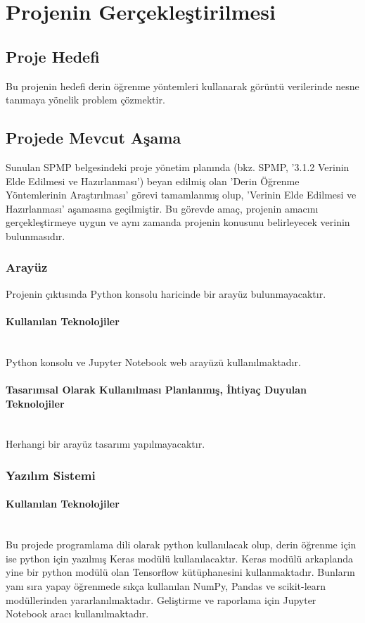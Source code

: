 \documentclass[12pt,a4paper]{article}
\newcommand{\subsubsubsection}[1]{\paragraph{#1}\mbox{}\\}
\begin{document}
    
    \newpage

    \tableofcontents
    \newpage


    \section{Projenin Gerçekleştirilmesi}
    \subsection{Proje Hedefi}
    Bu projenin hedefi derin öğrenme yöntemleri kullanarak görüntü verilerinde nesne tanımaya yönelik problem çözmektir.

    \subsection{Projede Mevcut Aşama}
    Sunulan SPMP belgesindeki proje yönetim planında (bkz. SPMP, '3.1.2 Verinin Elde Edilmesi ve Hazırlanması') beyan edilmiş olan 
    'Derin Öğrenme Yöntemlerinin Araştırılması' görevi tamamlanmış
    olup, 'Verinin Elde Edilmesi ve Hazırlanması' aşamasına geçilmiştir. Bu görevde amaç, projenin amacını gerçekleştirmeye uygun ve aynı zamanda projenin
    konusunu belirleyecek verinin bulunmasıdır.

    \subsubsection{Arayüz}
    Projenin çıktısında Python konsolu haricinde bir arayüz bulunmayacaktır.

    \subsubsubsection{Kullanılan Teknolojiler}
    Python konsolu ve Jupyter Notebook web arayüzü kullanılmaktadır.

    \subsubsubsection{Tasarımsal Olarak Kullanılması Planlanmış, İhtiyaç Duyulan Teknolojiler}
    Herhangi bir arayüz tasarımı yapılmayacaktır.
    
    \subsubsection{Yazılım Sistemi}

    \subsubsubsection{Kullanılan Teknolojiler} \label{tech}
    Bu projede programlama dili olarak python kullanılacak olup, derin öğrenme için ise python için yazılmış Keras modülü kullanılacaktır.
    Keras modülü arkaplanda yine bir python modülü olan Tensorflow kütüphanesini kullanmaktadır. Bunların yanı sıra yapay öğrenmede sıkça kullanılan
    NumPy, Pandas ve scikit-learn modüllerinden yararlanılmaktadır.
    Geliştirme ve raporlama için Jupyter Notebook aracı kullanılmaktadır.
\end{document}
